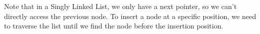 \documentclass[preview]{standalone}
\begin{document}
Note that in a Singly Linked List, we only have a next pointer, so we can't directly access the previous node. To insert a node at a specific position, we need to traverse the list until we find the node before the insertion position.\\
\end{document}
